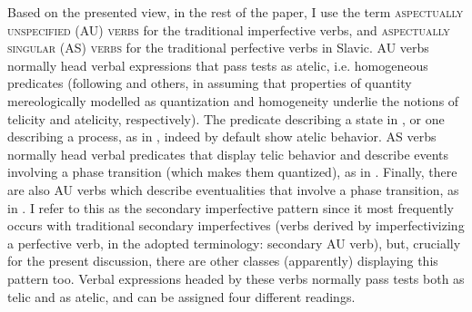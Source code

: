 \documentclass[output=paper]{langscibook}
\begin{document}
Based on the presented view, in the rest of the paper, I use the term \textsc{aspectually unspecified (AU) verbs} for the traditional imperfective verbs, and \textsc{aspectually singular (AS) verbs} for the traditional perfective verbs in Slavic. AU verbs normally head verbal expressions that pass tests as atelic, i.e. homogeneous predicates (following \cite{Bennet.1972, Verkuyl.1972, Bach.1986, Krifka.1989} and others, in assuming that properties of quantity mereologically modelled as quantization and homogeneity underlie the notions of telicity and atelicity, respectively). The predicate describing a state in , or one describing a process, as in , indeed by default show atelic behavior. AS verbs normally head verbal predicates that display telic behavior and describe events involving a phase transition (which makes them quantized), as in . Finally, there are also AU verbs which describe eventualities that involve a phase transition, as in . I refer to this as the secondary imperfective pattern since it most frequently occurs with traditional secondary imperfectives (verbs derived by imperfectivizing a perfective verb, in the adopted terminology: secondary AU verb), but, crucially for the present discussion, there are other classes (apparently) displaying this pattern too. Verbal expressions headed by these verbs normally pass tests both as telic and as atelic, and can be assigned four different readings.\largerpage
\end{document}
